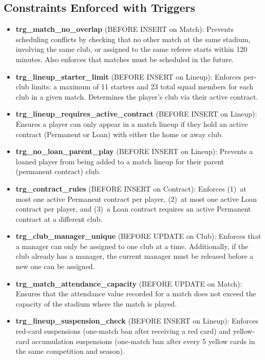 \documentclass[12pt]{article}
\begin{document}
\subsection{Constraints Enforced with Triggers}
\begin{itemize}[leftmargin=*]
    \item \textbf{trg\_match\_no\_overlap} (BEFORE INSERT on Match): Prevents scheduling conflicts by checking that no other match at the same stadium, involving the same club, or assigned to the same referee starts within 120 minutes. Also enforces that matches must be scheduled in the future.
    \item \textbf{trg\_lineup\_starter\_limit} (BEFORE INSERT on Lineup): Enforces per-club limits: a maximum of 11 starters and 23 total squad members for each club in a given match. Determines the player's club via their active contract.
    \item \textbf{trg\_lineup\_requires\_active\_contract} (BEFORE INSERT on Lineup): Ensures a player can only appear in a match lineup if they hold an active contract (Permanent or Loan) with either the home or away club.
    \item \textbf{trg\_no\_loan\_parent\_play} (BEFORE INSERT on Lineup): Prevents a loaned player from being added to a match lineup for their parent (permanent contract) club.
    \item \textbf{trg\_contract\_rules} (BEFORE INSERT on Contract): Enforces (1)~at most one active Permanent contract per player, (2)~at most one active Loan contract per player, and (3)~a Loan contract requires an active Permanent contract at a different club.
    \item \textbf{trg\_club\_manager\_unique} (BEFORE UPDATE on Club): Enforces that a manager can only be assigned to one club at a time. Additionally, if the club already has a manager, the current manager must be released before a new one can be assigned.
    \item \textbf{trg\_match\_attendance\_capacity} (BEFORE UPDATE on Match): Ensures that the attendance value recorded for a match does not exceed the capacity of the stadium where the match is played.
    \item \textbf{trg\_lineup\_suspension\_check} (BEFORE INSERT on Lineup): Enforces red-card suspensions (one-match ban after receiving a red card) and yellow-card accumulation suspensions (one-match ban after every 5 yellow cards in the same competition and season).
\end{itemize}
\end{document}
